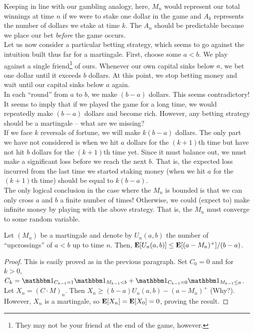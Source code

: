		Keeping in line with our gambling analogy, here, $M_n$ would represent our total winnings at time $n$ if we were to stake one dollar in the game and $A_k$ represents the number of dollars we stake at time $k$. The $A_n$ should be predictable because we place our bet \textit{before} the game occurs.\\

		Let us now consider a particular betting strategy, which seems to go against the intuition built thus far for a martingale. First, choose some $a<b$. We play against a single friend\footnote{They may not be your friend at the end of the game, however.} of ours. Whenever our own capital sinks below $a$, we bet one dollar until it exceeds $b$ dollars. At this point, we stop betting money and wait until our capital sinks below $a$ again.\\
		In each ``round'' from $a$ to $b$, we make $(b-a)$ dollars. This seems contradictory! It seems to imply that if we played the game for a long time, we would repeatedly make $(b-a)$ dollars and become rich. However, any betting strategy should be a martingale -- what are we missing?\\
		If we face $k$ reversals of fortune, we will make $k(b-a)$ dollars. The only part we have not considered is when we hit $a$ dollars for the $(k+1)$th time but have not hit $b$ dollars for the $(k+1)$th time yet. Since it must balance out, we must make a significant loss before we reach the next $b$. That is, the expected loss incurred from the last time we started staking money (when we hit $a$ for the $(k+1)$th time) should be equal to $k(b-a)$.\\
		The only logical conclusion in the case where the $M_n$ is bounded is that we can only cross $a$ and $b$ a finite number of times! Otherwise, we could (expect to) make infinite money by playing with the above strategy. That is, the $M_n$ must converge to some random variable.

		\begin{lemma}
			\label{doob's upcrossing lemma}
			Let $(M_n)$ be a martingale and denote by $U_n(a,b)$ the number of ``upcrossings'' of $a<b$ up to time $n$. Then, $\textbf{E}[U_n(a,b)] \leq \textbf{E}[(a-M_n)^+]/(b-a)$.
		\end{lemma}
		\begin{proof}
			This is easily proved as in the previous paragraph. Set $C_0 = 0$ and for $k>0$, $C_k = \indic_{C_{k-1}=1}\indic_{M_{k-1} < b} + \indic_{C_{k-1}=0}\indic_{M_{k-1} \leq a}$. Let $X_n = (C\cdot M)_n$. Then $X_n \geq (b-a)U_n(a,b) - (a-M_n)^+$ (Why?). However, $X_n$ is a martingale, so $\textbf{E}[X_n] = \textbf{E}[X_0] = 0$, proving the result.
		\end{proof}

